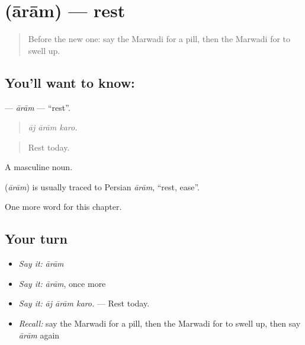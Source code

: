 \section[\texorpdfstring{\mw{आराम} (ārām)}{आराम (ārām)}]{ (ārām) — rest}

\label{lesson:MW-C254-aram}



\begin{quote}
Before the new one: say the Marwadi for a pill, then the Marwadi for to swell up.
\end{quote}

\subsection*{You'll want to know: }
\textbf{} — \emph{ārām} — \textquotedblleft{}rest\textquotedblright{}.

\begin{quote}
  
\end{quote}

\begin{quote}
\emph{āj ārām karo.}
\end{quote}

\begin{quote}
Rest today.
\end{quote}

A masculine noun.

\begin{cousinweb}
\textbf{} (\emph{ārām}) is usually traced to Persian \emph{ārām}, \textquotedblleft{}rest, ease\textquotedblright{}.
\end{cousinweb}

\begin{grammarlens}[title={What you've built}]
One more word for this chapter.
\end{grammarlens}

\subsection*{Your turn}
\begin{itemize}
\raggedright
  \item \emph{Say it:} \emph{ārām}
  \item \emph{Say it:} \emph{ārām}, once more
  \item \emph{Say it:} \emph{āj ārām karo.} — Rest today.
  \item \emph{Recall:} say the Marwadi for a pill, then the Marwadi for to swell up, then say \emph{ārām} again
\end{itemize}

